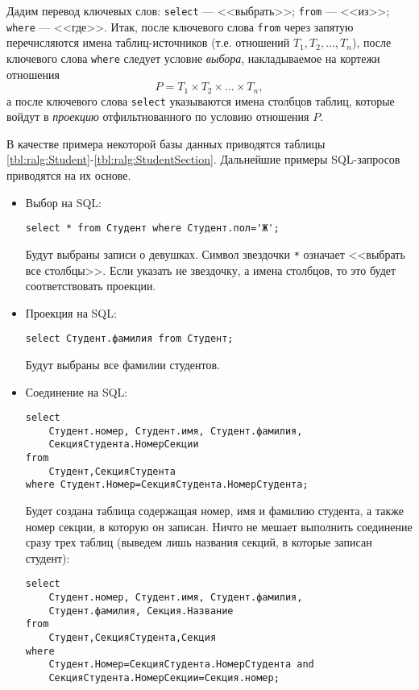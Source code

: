 Дадим перевод ключевых слов: \verb"select" --- <<выбрать>>; \verb"from" --- <<из>>; \verb"where" --- <<где>>. Итак, после ключевого слова \verb"from" через запятую перечисляются имена таблиц-источников (т.е. отношений $T_1,T_2,\ldots,T_n$), после ключевого слова \verb"where" следует условие \emph{выбора}, накладываемое на кортежи отношения \[P=T_1\times T_2\times\ldots\times T_n,\] а после ключевого слова \verb"select" указываются имена столбцов таблиц, которые войдут в \emph{проекцию} отфильтнованного по условию отношения $P$.

В качестве примера некоторой базы данных приводятся таблицы \ref{tbl:ralg:Student}-\ref{tbl:ralg:StudentSection}. Дальнейшие примеры SQL-запросов приводятся на их основе.

\begin{itemize}
    \item Выбор на SQL:
\begin{verbatim}
select * from Студент where Студент.пол='Ж';
\end{verbatim}    
        
    Будут выбраны записи о девушках. Символ звездочки \verb"*" означает <<выбрать все столбцы>>. Если указать не звездочку, а имена столбцов, то это будет соответствовать проекции.
    \item Проекция на SQL:
\begin{verbatim}    
select Студент.фамилия from Студент;
\end{verbatim}    

    Будут выбраны все фамилии студентов.
    \item Соединение на SQL:
\begin{verbatim}    
select 
    Студент.номер, Студент.имя, Студент.фамилия, 
    СекцияСтудента.НомерСекции 
from 
    Студент,СекцияСтудента 
where Студент.Номер=СекцияСтудента.НомерСтудента;
\end{verbatim}    
    Будет создана таблица содержащая номер, имя и фамилию студента, а также номер секции, в которую он записан. Ничто не мешает выполнить соединение сразу трех таблиц (выведем лишь названия секций, в которые записан студент):
\begin{verbatim}    
select 
    Студент.номер, Студент.имя, Студент.фамилия, 
    Студент.фамилия, Секция.Название
from 
    Студент,СекцияСтудента,Секция
where 
    Студент.Номер=СекцияСтудента.НомерСтудента and
    СекцияСтудента.НомерСекции=Секция.номер;
\end{verbatim}
\end{itemize}

